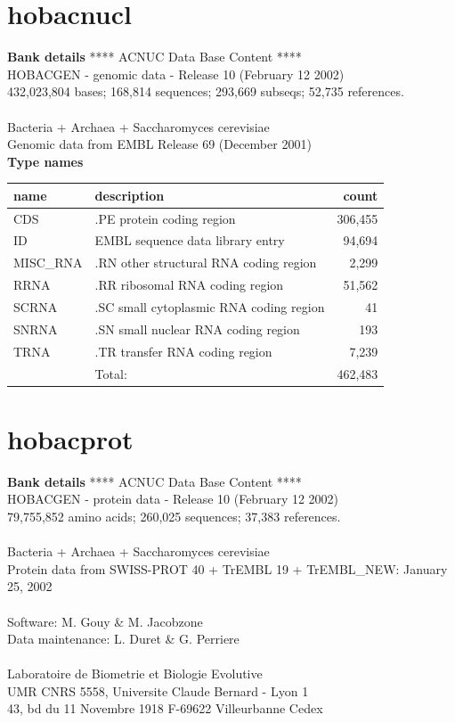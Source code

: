 \documentclass{article}
\begin{document}
\begin{Schunk}
\section{ hobacnucl }
\textbf{Bank details}
               ****     ACNUC Data Base Content      ****                      \\
          HOBACGEN - genomic data - Release 10 (February 12 2002)\\
432,023,804 bases; 168,814 sequences; 293,669 subseqs; 52,735 references.\\
                                                                               \\
              Bacteria + Archaea + Saccharomyces cerevisiae\\
            Genomic data from EMBL Release 69 (December 2001)\\


\textbf{Type names}
\noindent\begin{tabular}{llr}
\hline \hline
name & description & count \\
\hline
CDS  &  .PE protein coding region  &  306,455 \\
ID  &  EMBL sequence data library entry  &  94,694 \\
MISC\_RNA  &  .RN other structural RNA coding region  &  2,299 \\
RRNA  &  .RR ribosomal RNA coding region  &  51,562 \\
SCRNA  &  .SC small cytoplasmic RNA coding region  &  41 \\
SNRNA  &  .SN small nuclear RNA coding region  &  193 \\
TRNA  &  .TR transfer RNA coding region  &  7,239 \\
\hline
 & Total: & 462,483 \\
\hline \hline
\end{tabular}

\section{ hobacprot }
\textbf{Bank details}
               ****     ACNUC Data Base Content      ****\\
           HOBACGEN - protein data - Release 10 (February 12 2002)\\
          79,755,852 amino acids; 260,025 sequences; 37,383 references.\\
               \\
              Bacteria + Archaea + Saccharomyces cerevisiae\\
   Protein data from SWISS-PROT 40 + TrEMBL 19 + TrEMBL\_NEW: January 25, 2002\\
\\
Software: M. Gouy \& M. Jacobzone\\
Data maintenance: L. Duret \& G. Perriere\\
\\
Laboratoire de Biometrie et Biologie Evolutive\\
UMR CNRS 5558, Universite Claude Bernard - Lyon 1 \\
43, bd du 11 Novembre 1918 F-69622 Villeurbanne Cedex\\



\end{Schunk}
\end{document}
